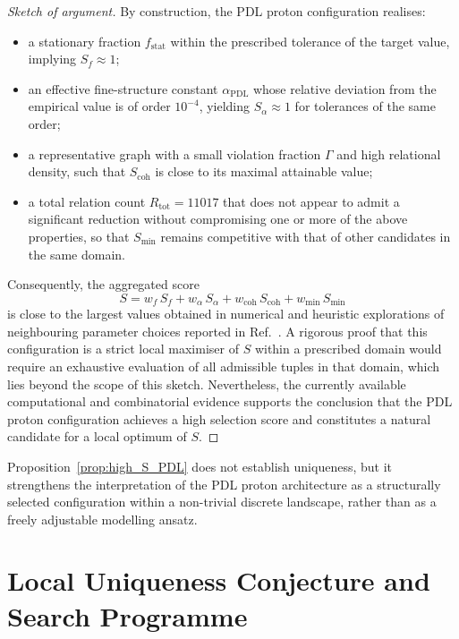 \documentclass[11pt,a4paper]{article}
\theoremstyle{definition}
\newcommand{\PDL}{\mathrm{PDL}}
\begin{document}
\begin{proof}[Sketch of argument]
By construction, the PDL proton configuration realises:
\begin{itemize}
  \item a stationary fraction $f_{\mathrm{stat}}$ within the prescribed tolerance of the target value, implying $S_f\approx 1$;\cite{Combinatorial_Proton_v2_2026}
  \item an effective fine-structure constant $\alpha_{\PDL}$ whose relative deviation from the empirical value is of order $10^{-4}$, yielding $S_{\alpha}\approx 1$ for tolerances of the same order;\cite{Alpha_PDL_v2_2026}
  \item a representative graph with a small violation fraction $\Gamma$ and high relational density, such that $S_{\mathrm{coh}}$ is close to its maximal attainable value;\cite{PDL_Main_2026,PDL_Global_Mapping_2026}
  \item a total relation count $R_{\mathrm{tot}}=11017$ that does not appear to admit a significant reduction without compromising one or more of the above properties, so that $S_{\mathrm{min}}$ remains competitive with that of other candidates in the same domain.\cite{Combinatorial_Proton_v2_2026}
\end{itemize}
Consequently, the aggregated score
\[
 S = w_f\, S_f + w_{\alpha}\, S_{\alpha} + w_{\mathrm{coh}}\, S_{\mathrm{coh}} + w_{\mathrm{min}}\, S_{\mathrm{min}}
\]
is close to the largest values obtained in numerical and heuristic explorations of neighbouring parameter choices reported in Ref.~\cite{Combinatorial_Proton_v2_2026}. A rigorous proof that this configuration is a strict local maximiser of $S$ within a prescribed domain would require an exhaustive evaluation of all admissible tuples in that domain, which lies beyond the scope of this sketch. Nevertheless, the currently available computational and combinatorial evidence supports the conclusion that the PDL proton configuration achieves a high selection score and constitutes a natural candidate for a local optimum of $S$.\cite{Combinatorial_Proton_v2_2026,PDL_Global_Mapping_2026}
\end{proof}

Proposition~\ref{prop:high_S_PDL} does not establish uniqueness, but it strengthens the interpretation of the PDL proton architecture as a structurally selected configuration within a non-trivial discrete landscape, rather than as a freely adjustable modelling ansatz.\cite{Combinatorial_Proton_v2_2026}

\section{Local Uniqueness Conjecture and Search Programme}
\label{sec:uniqueness_programme}
\end{document}
